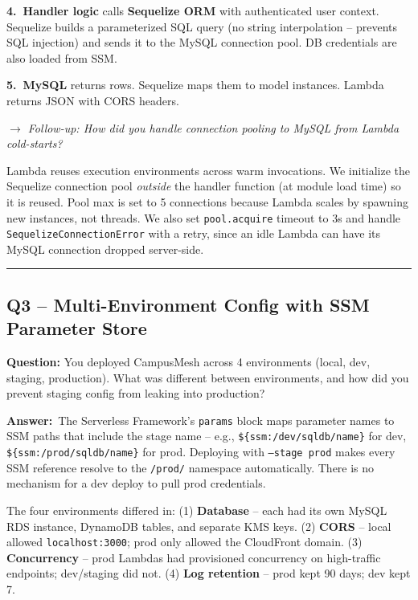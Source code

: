 \documentclass[letterpaper,10pt]{article}
\newlength{\boxwidth}
\newcommand{\questionbox}[1]{%
  \vspace{6pt}%
  \noindent\colorbox{qbg}{%
    \begin{minipage}{\boxwidth}%
      \vspace{3pt}\textbf{\textcolor{nordblue}{Question:}} #1\vspace{3pt}%
    \end{minipage}%
  }\vspace{2pt}%
}
\newcommand{\answerlabel}{\noindent\textbf{\textcolor{answerblue}{Answer:}}~}
\newcommand{\followup}[1]{\smallskip\noindent\textit{\textcolor{nordblue}{$\rightarrow$ Follow-up: #1}}\smallskip}
\begin{document}
\textbf{4.~Handler logic} calls \textbf{Sequelize ORM} with authenticated user context. Sequelize builds a parameterized SQL query (no string interpolation -- prevents SQL injection) and sends it to the MySQL connection pool. DB credentials are also loaded from SSM.

\textbf{5.~MySQL} returns rows. Sequelize maps them to model instances. Lambda returns JSON with CORS headers.

\followup{How did you handle connection pooling to MySQL from Lambda cold-starts?}

\noindent Lambda reuses execution environments across warm invocations. We initialize the Sequelize connection pool \textit{outside} the handler function (at module load time) so it is reused. Pool max is set to 5 connections because Lambda scales by spawning new instances, not threads. We also set \texttt{pool.acquire} timeout to 3s and handle \texttt{SequelizeConnectionError} with a retry, since an idle Lambda can have its MySQL connection dropped server-side.

\medskip\rule{\linewidth}{0.2pt}

\subsection*{Q3 -- Multi-Environment Config with SSM Parameter Store}

\questionbox{You deployed CampusMesh across 4 environments (local, dev, staging, production). What was different between environments, and how did you prevent staging config from leaking into production?}

\answerlabel The Serverless Framework's \texttt{params} block maps parameter names to SSM paths that include the stage name -- e.g., \texttt{\$\{ssm:/dev/sqldb/name\}} for dev, \texttt{\$\{ssm:/prod/sqldb/name\}} for prod. Deploying with \texttt{--stage prod} makes every SSM reference resolve to the \texttt{/prod/} namespace automatically. There is no mechanism for a dev deploy to pull prod credentials.

The four environments differed in: (1) \textbf{Database} -- each had its own MySQL RDS instance, DynamoDB tables, and separate KMS keys. (2) \textbf{CORS} -- local allowed \texttt{localhost:3000}; prod only allowed the CloudFront domain. (3) \textbf{Concurrency} -- prod Lambdas had provisioned concurrency on high-traffic endpoints; dev/staging did not. (4) \textbf{Log retention} -- prod kept 90 days; dev kept 7.
\end{document}
